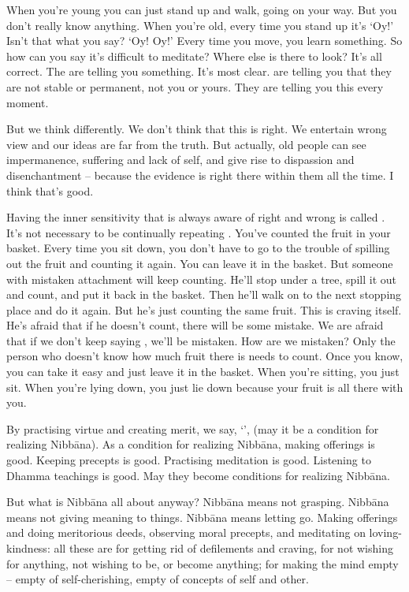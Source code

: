 When you're young you can just stand up and walk, going on your way. But you don't really know anything. When you're old, every time you stand up it's `Oy!' Isn't that what you say? `Oy! Oy!' Every time you move, you learn something. So how can you say it's difficult to meditate? Where else is there to look? It's all correct. The  are telling you something. It's most clear.  are telling you that they are not stable or permanent, not you or yours. They are telling you this every moment.

But we think differently. We don't think that this is right. We entertain wrong view and our ideas are far from the truth. But actually, old people can see impermanence, suffering and lack of self, and give rise to dispassion and disenchantment -- because the evidence is right there within them all the time. I think that's good.

Having the inner sensitivity that is always aware of right and wrong is called . It's not necessary to be continually repeating . You've counted the fruit in your basket. Every time you sit down, you don't have to go to the trouble of spilling out the fruit and counting it again. You can leave it in the basket. But someone with mistaken attachment will keep counting. He'll stop under a tree, spill it out and count, and put it back in the basket. Then he'll walk on to the next stopping place and do it again. But he's just counting the same fruit. This is craving itself. He's afraid that if he doesn't count, there will be some mistake. We are afraid that if we don't keep saying , we'll be mistaken. How are we mistaken? Only the person who doesn't know how much fruit there is needs to count. Once you know, you can take it easy and just leave it in the basket. When you're sitting, you just sit. When you're lying down, you just lie down because your fruit is all there with you.

By practising virtue and creating merit, we say, `', (may it be a condition for realizing Nibb\=ana). As a condition for realizing Nibb\=ana, making offerings is good. Keeping precepts is good. Practising meditation is good. Listening to Dhamma teachings is good. May they become conditions for realizing Nibb\=ana.

But what is Nibb\=ana all about anyway? Nibb\=ana means not grasping. Nibb\=ana means not giving meaning to things. Nibb\=ana means letting go. Making offerings and doing meritorious deeds, observing moral precepts, and meditating on loving-kindness: all these are for getting rid of defilements and craving, for not wishing for anything, not wishing to be, or become anything; for making the mind empty -- empty of self-cherishing, empty of concepts of self and other.

